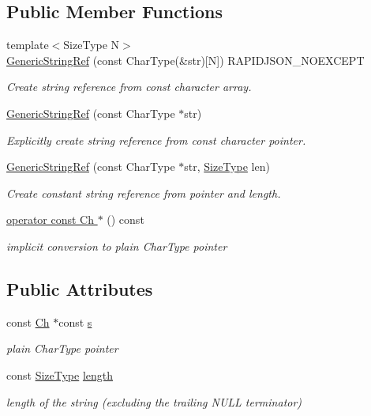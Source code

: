 \subsection*{Public Member Functions}
\begin{DoxyCompactItemize}
\item 
{\footnotesize template$<$Size\+Type N$>$ }\\\hyperlink{structGenericStringRef_aae0c070f914d2486a560150a927c22dc}{Generic\+String\+Ref} (const Char\+Type(\&str)\mbox{[}N\mbox{]}) R\+A\+P\+I\+D\+J\+S\+O\+N\+\_\+\+N\+O\+E\+X\+C\+E\+PT
\begin{DoxyCompactList}\small\item\em Create string reference from {\ttfamily const} character array. \end{DoxyCompactList}\item 
\hyperlink{structGenericStringRef_a9e80d81d5ad49cf0fb4128ace8c548d9}{Generic\+String\+Ref} (const Char\+Type $\ast$str)
\begin{DoxyCompactList}\small\item\em Explicitly create string reference from {\ttfamily const} character pointer. \end{DoxyCompactList}\item 
\hyperlink{structGenericStringRef_a8b2c6a7fdc4da1e7055f7fdcf0ac517f}{Generic\+String\+Ref} (const Char\+Type $\ast$str, \hyperlink{rapidjson_8h_a5ed6e6e67250fadbd041127e6386dcb5}{Size\+Type} len)
\begin{DoxyCompactList}\small\item\em Create constant string reference from pointer and length. \end{DoxyCompactList}\item 
\hyperlink{structGenericStringRef_a61a4241c23f65626ddc1da4ae5dac1b8}{operator const Ch $\ast$} () const 
\begin{DoxyCompactList}\small\item\em implicit conversion to plain Char\+Type pointer \end{DoxyCompactList}\end{DoxyCompactItemize}
\subsection*{Public Attributes}
\begin{DoxyCompactItemize}
\item 
const \hyperlink{structGenericStringRef_a16908c3fce41be380061330c14ba2140}{Ch} $\ast$const \hyperlink{structGenericStringRef_ac555994afd329bc9bc1780acf2f9d9be}{s}
\begin{DoxyCompactList}\small\item\em plain Char\+Type pointer \end{DoxyCompactList}\item 
const \hyperlink{rapidjson_8h_a5ed6e6e67250fadbd041127e6386dcb5}{Size\+Type} \hyperlink{structGenericStringRef_a4a96d618744ad73f766a1551b1d517fe}{length}
\begin{DoxyCompactList}\small\item\em length of the string (excluding the trailing N\+U\+LL terminator) \end{DoxyCompactList}\end{DoxyCompactItemize}
